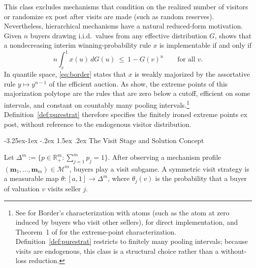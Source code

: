 \documentclass[12pt]{article}
\makeatletter
\newcommand{\citeasnoun}[1]{\citet{#1}}
\theoremstyle{mystyle}
\theoremstyle{mystyle2}
\newcommand{\mmpfont}{\scshape}
\renewcommand\subsection{\@startsection{subsection}{2}{\z@}%
                                     {-3.25ex\@plus -1ex \@minus -.2ex}%
                                     {1.5ex \@plus .2ex}%
                                     {\normalfont\normalsize\mmpfont}}
\newcommand{\M}{\mathcal{M}}
\newcommand{\bmm}{\mathbf{m}}
\newcommand{\1}{\mathbf{1}}
\renewcommand{\Re}{\mathbb{R}}
\makeatother
\begin{document}
This class excludes mechanisms that condition on the realized number of visitors or randomize ex post after visits are made (such as random reserves). Nevertheless, hierarchical mechanisms have a natural reduced-form motivation. Given $n$ buyers drawing i.i.d.\ values from any effective distribution $G$, \citeasnoun{border1} shows that a nondecreasing interim winning-probability rule $x$ is implementable if and only if
\begin{equation}\label{eq:border}
n\int_v^1 x(u)\,dG(u)\ \le\ 1 - G(v)^n \qquad \text{for all } v.
\end{equation}
In quantile space, \eqref{eq:border} states that $x$ is weakly majorized by the assortative rule $y\mapsto y^{n-1}$ of the efficient auction. As \citeasnoun{kleiner2021} show, the extreme points of this majorization polytope are the rules that are zero below a cutoff, efficient on some intervals, and constant on countably many pooling intervals.\footnote{See \citeasnoun{che2013} for Border's characterization with atoms (such as the atom at zero induced by buyers who visit other sellers), \citeasnoun{hartreny2015} for direct implementation, and Theorem~1 of \citeasnoun{kleiner2021} for the extreme-point characterization. Definition~\ref{def:purestrat} restricts to finitely many pooling intervals; because visits are endogenous, this class is a structural choice rather than a without-loss reduction.} Definition~\ref{def:purestrat} therefore specifies the finitely ironed extreme points ex post, without reference to the endogenous visitor distribution.

\subsection{The Visit Stage and Solution Concept}

Let $\Delta^m:=\{p\in\Re_+^m:\sum_{j=1}^m p_j=1\}$. After observing a mechanism profile $(\bmm_1,\dots,\bmm_m)\in\M^m$, buyers play a visit subgame. A symmetric visit strategy is a measurable map $\theta:[a,1]\to\Delta^m$, where $\theta_j(v)$ is the probability that a buyer of valuation $v$ visits seller $j$.
\end{document}
